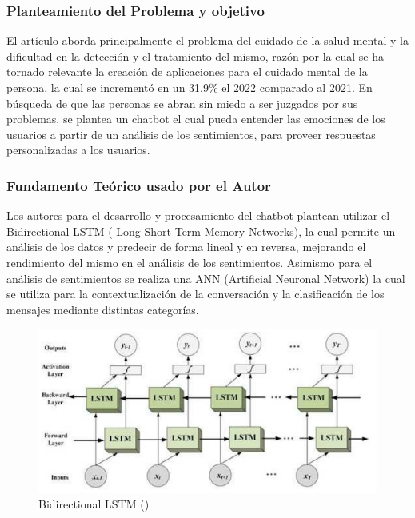 \subsubsection{Planteamiento del Problema y objetivo }

El artículo aborda principalmente el problema del cuidado de la salud mental y la dificultad en la detección y el tratamiento del mismo, razón por la cual se ha tornado relevante la creación de aplicaciones para el cuidado mental de la persona, la cual se incrementó en un 31.9\% el 2022 comparado al 2021. En búsqueda de que las personas se abran sin miedo a ser juzgados por sus problemas, se plantea un chatbot el cual pueda entender las emociones de los usuarios a partir de un análisis de los sentimientos, para proveer respuestas personalizadas a los usuarios.

\subsubsection{Fundamento Teórico usado por el Autor}

Los autores para el desarrollo y procesamiento del chatbot plantean utilizar el Bidirectional LSTM ( Long Short Term Memory Networks), la cual permite un análisis de los datos y predecir de forma lineal y en reversa, mejorando el rendimiento del mismo en el análisis de los sentimientos.
Asimismo para el análisis de sentimientos se realiza una ANN (Artificial Neuronal Network) la cual se utiliza para la contextualización de la conversación y la clasificación de los mensajes mediante distintas categorías.

\begin{figure}[h]
	\begin{center}
		\includegraphics[width=1\textwidth]{2/figures/5_1.png}
		\caption{Bidirectional LSTM (\cite{pr_AIPCMHBSA})}
	\end{center}
\end{figure}

